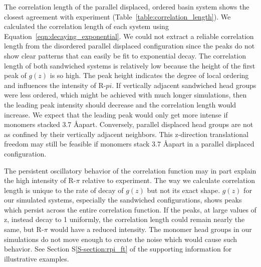 \documentclass[journal=jpcbfk,manuscript=article]{achemso}
\begin{document}

  The correlation length of the parallel displaced, ordered basin system shows
  the closest agreement with experiment (Table~\ref{table:correlation_length}). We calculated the 
  correlation length of each system using Equation~\ref{eqn:decaying_exponential}. We could
  not extract a reliable correlation length from the disordered parallel displaced configuration
  since the peaks do not show clear patterns that can easily be fit to exponential decay. The 
  correlation length of both sandwiched systems is relatively low because the height of the first
  peak of $g(z)$ is so high. The peak height indicates the degree of local ordering and influences
  the intensity of R-$pi$. If vertically adjacent sandwiched head groups were less ordered, which
  might be achieved with much longer simulations, then the leading peak intensity should decrease and
  the correlation length would increase. We expect that the leading peak would only get more intense 
  if monomers stacked 3.7 \AA apart. Conversely, parallel displaced head groups are not as confined
  by their vertically adjacent neighbors. This z-direction translational freedom may still be 
  feasible if monomers stack 3.7 \AA apart in a parallel displaced configuration.
  
  
  The persistent oscillatory behavior of the correlation function may in part explain the high
  intensity of R-$\pi$ relative to experiment. The way we calculate correlation length is
  unique to the rate of decay of $g(z)$ but not its exact shape. $g(z)$ for our 
  simulated systems, especially the sandwiched configurations, shows peaks which persist across
  the entire correlation function. If the peaks, at large values of z, instead decay to 1 uniformly,
  the correlation length could remain nearly the same, but R-$\pi$ would have a reduced intensity. 
  The monomer head groups in our simulations do not move enough to create the noise which would 
  cause such behavior. See Section S\ref{S-section:rpi_ft} of the supporting information for
  illustrative examples.
  
\end{document}
